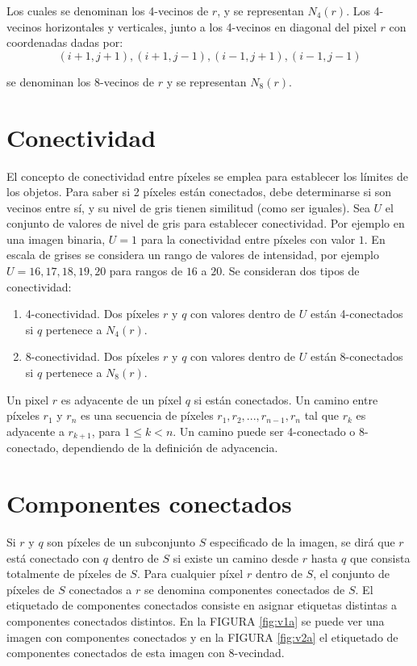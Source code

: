 Los cuales se denominan los 4-vecinos de $r$, y se representan $N_{4}(r)$.
Los 4-vecinos horizontales y verticales, junto a los 4-vecinos en diagonal del
pixel $r$ con coordenadas dadas por:
\begin{equation}
\label{eq:vec1}
(i+1,j+1),(i+1,j-1),(i-1,j+1),(i-1,j-1)
\end{equation}

se denominan los 8-vecinos de $r$ y se representan $N_{8}(r)$.
%
%
  \section{Conectividad}
El concepto de conectividad entre píxeles se emplea para establecer los límites de los objetos. Para saber si 2 píxeles están conectados, debe determinarse si son vecinos entre sí, y su nivel de gris tienen similitud (como ser iguales).
Sea $U$ el conjunto de valores de nivel de gris para establecer conectividad. Por ejemplo en una imagen binaria, $U = {1}$ para la conectividad entre píxeles con valor $1$. En escala de grises se considera un rango de valores de intensidad, por ejemplo $U = {16,17,18,19,20}$ para rangos de $16$ a $20$. Se consideran dos tipos de conectividad:

\begin{enumerate}
 \item 4-conectividad. Dos píxeles $r$ y $q$ con valores dentro de $U$ están 4-conectados si $q$ pertenece a $N_{4}(r)$.
 \item 8-conectividad. Dos píxeles $r$ y $q$ con valores dentro de $U$ están 8-conectados si $q$ pertenece a $N_{8}(r)$.

\end{enumerate}
Un pixel $r$ es adyacente de un píxel $q$ si están conectados. Un camino entre píxeles $r_{1}$ y $r_{n}$ es una secuencia de píxeles $r_{1}, r_{2},..., r_{n-1}, r_{n}$ tal que $r_{k}$  es adyacente a $r_{k+1}$, para $1\leq k < n$. Un camino puede ser 4-conectado o 8-conectado, dependiendo de la definición de adyacencia.
  \section{Componentes conectados}

  Si $r$ y $q$ son píxeles de un subconjunto $S$ especificado de la imagen, se dirá que $r$ está conectado con $q$ dentro de $S$ si existe un camino desde $r$ hasta $q$ que consista totalmente de píxeles de $S$. Para cualquier píxel $r$ dentro de $S$, el conjunto de píxeles de $S$ conectados a $r$ se denomina componentes conectados de $S$.
El etiquetado de componentes conectados consiste en asignar etiquetas distintas a componentes conectados distintos. En la FIGURA \ref{fig:v1a} se puede ver una imagen con componentes conectados y en la FIGURA \ref{fig:v2a} el etiquetado de componentes conectados de esta imagen con 8-vecindad. 
  
